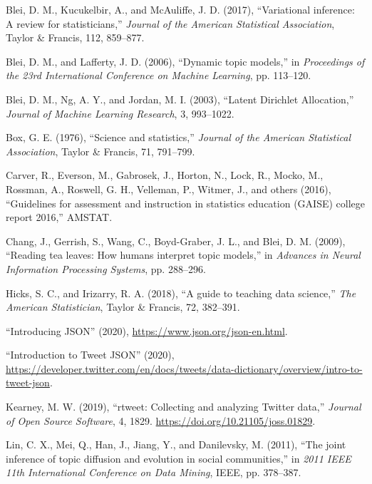 \documentclass[
]{article}
\newlength{\cslhangindent}
\newenvironment{cslreferences}%
  {\setlength{\parindent}{0pt}%
  \everypar{\setlength{\hangindent}{\cslhangindent}}\ignorespaces}%
  {\par}
\begin{document}
\hypertarget{refs}{}
\begin{cslreferences}
\leavevmode\hypertarget{ref-blei2017variational}{}%
Blei, D. M., Kucukelbir, A., and McAuliffe, J. D. (2017), ``Variational inference: A review for statisticians,'' \emph{Journal of the American Statistical Association}, Taylor \& Francis, 112, 859--877.

\leavevmode\hypertarget{ref-blei2006dynamic}{}%
Blei, D. M., and Lafferty, J. D. (2006), ``Dynamic topic models,'' in \emph{Proceedings of the 23rd International Conference on Machine Learning}, pp. 113--120.

\leavevmode\hypertarget{ref-blei2003latent}{}%
Blei, D. M., Ng, A. Y., and Jordan, M. I. (2003), ``Latent Dirichlet Allocation,'' \emph{Journal of Machine Learning Research}, 3, 993--1022.

\leavevmode\hypertarget{ref-box1976science}{}%
Box, G. E. (1976), ``Science and statistics,'' \emph{Journal of the American Statistical Association}, Taylor \& Francis, 71, 791--799.

\leavevmode\hypertarget{ref-carver2016guidelines}{}%
Carver, R., Everson, M., Gabrosek, J., Horton, N., Lock, R., Mocko, M., Rossman, A., Roswell, G. H., Velleman, P., Witmer, J., and others (2016), ``Guidelines for assessment and instruction in statistics education (GAISE) college report 2016,'' AMSTAT.

\leavevmode\hypertarget{ref-chang2009reading}{}%
Chang, J., Gerrish, S., Wang, C., Boyd-Graber, J. L., and Blei, D. M. (2009), ``Reading tea leaves: How humans interpret topic models,'' in \emph{Advances in Neural Information Processing Systems}, pp. 288--296.

\leavevmode\hypertarget{ref-hicks2018guide}{}%
Hicks, S. C., and Irizarry, R. A. (2018), ``A guide to teaching data science,'' \emph{The American Statistician}, Taylor \& Francis, 72, 382--391.

\leavevmode\hypertarget{ref-json}{}%
``Introducing JSON'' (2020), \url{https://www.json.org/json-en.html}.

\leavevmode\hypertarget{ref-tweet_json}{}%
``Introduction to Tweet JSON'' (2020), \url{https://developer.twitter.com/en/docs/tweets/data-dictionary/overview/intro-to-tweet-json}.

\leavevmode\hypertarget{ref-rtweet-package}{}%
Kearney, M. W. (2019), ``rtweet: Collecting and analyzing Twitter data,'' \emph{Journal of Open Source Software}, 4, 1829. \url{https://doi.org/10.21105/joss.01829}.

\leavevmode\hypertarget{ref-lin2011joint}{}%
Lin, C. X., Mei, Q., Han, J., Jiang, Y., and Danilevsky, M. (2011), ``The joint inference of topic diffusion and evolution in social communities,'' in \emph{2011 IEEE 11th International Conference on Data Mining}, IEEE, pp. 378--387.


\end{cslreferences}
\end{document}
